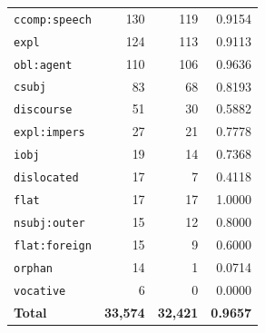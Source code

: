 \begin{table}[ht]
\begin{tabular}{lrrr}
\texttt{ccomp\!:\!speech} & 130 & 119 & 0.9154 \\
\texttt{expl} & 124 & 113 & 0.9113 \\
\texttt{obl\!:\!agent} & 110 & 106 & 0.9636 \\
\texttt{csubj} & 83 & 68 & 0.8193 \\
\texttt{discourse} & 51 & 30 & 0.5882 \\
\texttt{expl\!:\!impers} & 27 & 21 & 0.7778 \\
\texttt{iobj} & 19 & 14 & 0.7368 \\
\texttt{dislocated} & 17 & 7 & 0.4118 \\
\texttt{flat} & 17 & 17 & 1.0000 \\
\texttt{nsubj\!:\!outer} & 15 & 12 & 0.8000 \\
\texttt{flat\!:\!foreign} & 15 & 9 & 0.6000 \\
\texttt{orphan} & 14 & 1 & 0.0714 \\
\texttt{vocative} & 6 & 0 & 0.0000 \\
\midrule
\textbf{Total} & \textbf{33,574} & \textbf{32,421} & \textbf{0.9657} \\
\bottomrule
\end{tabular}
\end{table}
